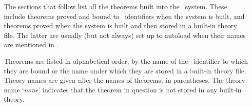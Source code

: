 The sections that follow list all the theorems built into the \HOL\ system.
These include theorems proved and bound to \ML\ identifiers when the system is
built, and theorems proved when the system is built and then stored in a
built-in theory file.  The latter are usually (but not always) set up to
autoload when their names are mentioned in \ML.

Theorems are listed in alphabetical order, by the name of the \ML\ identifier
to which they are bound or the name under which they are stored in a built-in
theory file.  Theory names are given after the names of theorems, in
parentheses. The theory name `{\it none}' indicates that the theorem in
question is not stored in any built-in theory.
